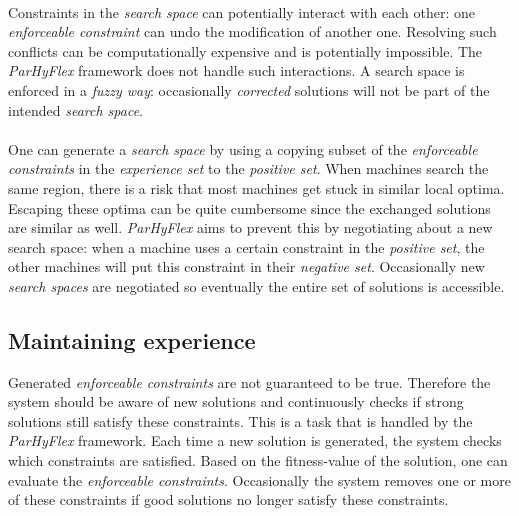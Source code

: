 \documentclass[a4paper,10pt]{article}
\newcommand{\ssclab}[1]{\label{ssc:#1}}
\theoremstyle{definition}
\begin{document}
\paragraph{}
Constraints in the \emph{search space} can potentially interact with each other: one \emph{enforceable constraint} can undo the modification of another one. Resolving such conflicts can be computationally expensive and is potentially impossible. The \emph{ParHyFlex} framework does not handle such interactions. A search space is enforced in a \emph{fuzzy way}: occasionally \emph{corrected} solutions will not be part of the intended \emph{search space}.

\paragraph{}
One can generate a \emph{search space} by using a copying subset of the \emph{enforceable constraints} in the \emph{experience set} to the \emph{positive set}. When machines search the same region, there is a risk that most machines get stuck in similar local optima. Escaping these optima can be quite cumbersome since the exchanged solutions are similar as well. \emph{ParHyFlex} aims to prevent this by negotiating about a new search space: when a machine uses a certain constraint in the \emph{positive set}, the other machines will put this constraint in their \emph{negative set}. Occasionally new \emph{search spaces} are negotiated so eventually the entire set of solutions is accessible.

\subsection{Maintaining experience}
\ssclab{maintainingexperience}
Generated \emph{enforceable constraints} are not guaranteed to be true. Therefore the system should be aware of new solutions and continuously checks if strong solutions still satisfy these constraints. This is a task that is handled by the \emph{ParHyFlex} framework. Each time a new solution is generated, the system checks which constraints are satisfied. Based on the fitness-value of the solution, one can evaluate the \emph{enforceable constraints}. Occasionally the system removes one or more of these constraints if good solutions no longer satisfy these constraints.
\end{document}
